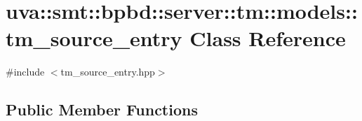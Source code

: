 \hypertarget{classuva_1_1smt_1_1bpbd_1_1server_1_1tm_1_1models_1_1tm__source__entry}{}\section{uva\+:\+:smt\+:\+:bpbd\+:\+:server\+:\+:tm\+:\+:models\+:\+:tm\+\_\+source\+\_\+entry Class Reference}
\label{classuva_1_1smt_1_1bpbd_1_1server_1_1tm_1_1models_1_1tm__source__entry}


{\ttfamily \#include $<$tm\+\_\+source\+\_\+entry.\+hpp$>$}

\subsection*{Public Member Functions}
